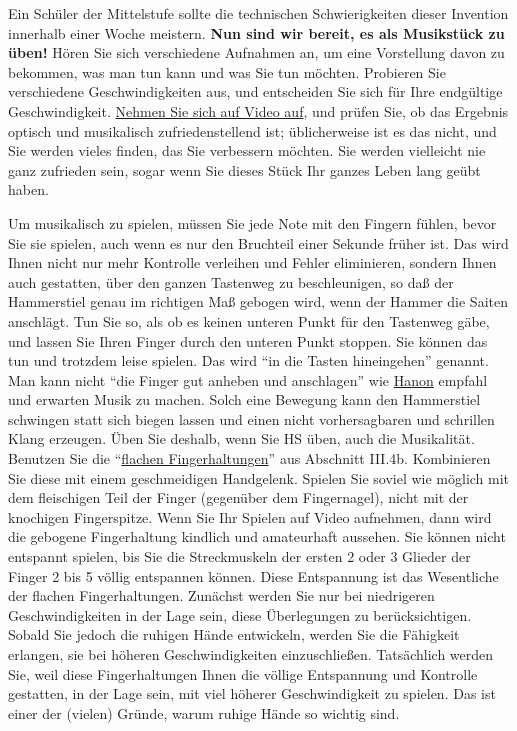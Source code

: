 Ein Schüler der Mittelstufe sollte die technischen Schwierigkeiten dieser Invention innerhalb einer Woche meistern.
\textbf{Nun sind wir bereit, es als Musikstück zu üben!}
Hören Sie sich verschiedene Aufnahmen an, um eine Vorstellung davon zu bekommen, was man tun kann und was Sie tun möchten.
Probieren Sie verschiedene Geschwindigkeiten aus, und entscheiden Sie sich für Ihre endgültige Geschwindigkeit.
\hyperref[c1iii13]{Nehmen Sie sich auf Video auf}, und prüfen Sie, ob das Ergebnis optisch und musikalisch zufriedenstellend ist; üblicherweise ist es das nicht, und Sie werden vieles finden, das Sie verbessern möchten. Sie werden vielleicht nie ganz zufrieden sein, sogar wenn Sie dieses Stück Ihr ganzes Leben lang geübt haben.

Um musikalisch zu spielen, müssen Sie jede Note mit den Fingern fühlen, bevor Sie sie spielen, auch wenn es nur den Bruchteil einer Sekunde früher ist.
Das wird Ihnen nicht nur mehr Kontrolle verleihen und Fehler eliminieren, sondern Ihnen auch gestatten, über den ganzen Tastenweg zu beschleunigen, so daß der Hammerstiel genau im richtigen Maß gebogen wird, wenn der Hammer die Saiten anschlägt.
Tun Sie so, als ob es keinen unteren Punkt für den Tastenweg gäbe, und lassen Sie Ihren Finger durch den unteren Punkt stoppen.
Sie können das tun und trotzdem leise spielen.
Das wird \enquote{in die Tasten hineingehen} genannt.
Man kann nicht \enquote{die Finger gut anheben und anschlagen} wie \hyperref[c1iii7h]{Hanon} empfahl und erwarten Musik zu machen.
Solch eine Bewegung kann den Hammerstiel schwingen statt sich biegen lassen und einen nicht vorhersagbaren und schrillen Klang erzeugen.
Üben Sie deshalb, wenn Sie HS üben, auch die Musikalität.
Benutzen Sie die \enquote{\hyperref[c1iii4b]{flachen Fingerhaltungen}} aus Abschnitt III.4b.
Kombinieren Sie diese mit einem geschmeidigen Handgelenk.
Spielen Sie soviel wie möglich mit dem fleischigen Teil der Finger (gegenüber dem Fingernagel), nicht mit der knochigen Fingerspitze.
Wenn Sie Ihr Spielen auf Video aufnehmen, dann wird die gebogene Fingerhaltung kindlich und amateurhaft aussehen.
Sie können nicht entspannt spielen, bis Sie die Streckmuskeln der ersten 2 oder 3 Glieder der Finger 2 bis 5 völlig entspannen können.
Diese Entspannung ist das Wesentliche der flachen Fingerhaltungen.
Zunächst werden Sie nur bei niedrigeren Geschwindigkeiten in der Lage sein, diese Überlegungen zu berücksichtigen.
Sobald Sie jedoch die ruhigen Hände entwickeln, werden Sie die Fähigkeit erlangen, sie bei höheren Geschwindigkeiten einzuschließen.
Tatsächlich werden Sie, weil diese Fingerhaltungen Ihnen die völlige Entspannung und Kontrolle gestatten, in der Lage sein, mit viel höherer Geschwindigkeit zu spielen.
Das ist einer der (vielen) Gründe, warum ruhige Hände so wichtig sind.


